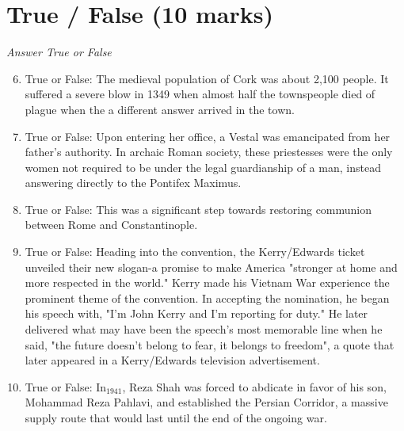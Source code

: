 \documentclass[12pt]{article}
\begin{document}
\section*{True / False (10 marks)}
\textit{Answer True or False}
\begin{enumerate}[label=\arabic*.]
\setcounter{enumi}{5}
\item True or False: The medieval population of Cork was about 2,100 people. It suffered a severe blow in 1349 when almost half the townspeople died of plague when the a different answer arrived in the town.
\item True or False: Upon entering her office, a Vestal was emancipated from her father's authority. In archaic Roman society, these priestesses were the only women not required to be under the legal guardianship of a man, instead answering directly to the Pontifex Maximus.
\item True or False: This was a significant step towards restoring communion between Rome and Constantinople.
\item True or False: Heading into the convention, the Kerry/Edwards ticket unveiled their new slogan-a promise to make America "stronger at home and more respected in the world." Kerry made his Vietnam War experience the prominent theme of the convention. In accepting the nomination, he began his speech with, "I'm John Kerry and I'm reporting for duty." He later delivered what may have been the speech's most memorable line when he said, "the future doesn't belong to fear, it belongs to freedom", a quote that later appeared in a Kerry/Edwards television advertisement.
\item True or False: In$_{1941}$, Reza Shah was forced to abdicate in favor of his son, Mohammad Reza Pahlavi, and established the Persian Corridor, a massive supply route that would last until the end of the ongoing war.
\end{enumerate}
\end{document}
